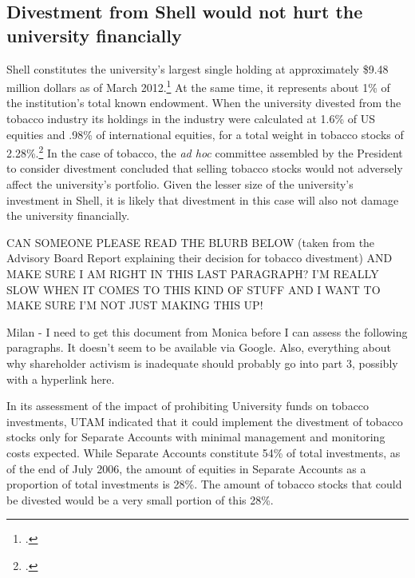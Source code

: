 	\subsection{Divestment from Shell would not hurt the university financially}
	\label{sec:ShellNotFinancialHurt}



Shell constitutes the university's largest single holding at approximately \$9.48 million dollars as of March 2012.\footcite[][]{UTAM_2012}  
At the same time, it represents about 1\% of the institution's total known endowment.
When the university divested from the tobacco industry its holdings in the industry were calculated at 1.6\% of US equities and .98\% of international equities, for a total weight in tobacco stocks of 2.28\%.\footcite[][]{TobaccoReport_2007}
In the case of tobacco, the \emph{ad hoc} committee assembled by the President to consider divestment concluded that selling tobacco stocks  would not adversely affect the university's portfolio. 
Given the lesser size of the university's investment in Shell, it is likely that divestment in this case will also not damage the university financially.



\begin{vcom}
CAN SOMEONE PLEASE READ THE BLURB BELOW (taken from the Advisory Board Report explaining their decision for tobacco divestment) AND MAKE SURE I AM RIGHT IN THIS LAST PARAGRAPH? I’M REALLY SLOW WHEN IT COMES TO THIS KIND OF STUFF AND I WANT TO MAKE SURE I’M NOT JUST MAKING THIS UP!

	Milan - I need to get this document from Monica before I can assess the following paragraphs. It doesn't seem to be available via Google. Also, everything about why shareholder activism is inadequate should probably go into part 3, possibly with a hyperlink here. 
\end{vcom}



In its assessment of the impact of prohibiting University funds on tobacco investments, UTAM indicated that it could implement the divestment of tobacco stocks only for Separate Accounts with minimal management and monitoring costs expected. 
While Separate Accounts constitute 54\% of total investments, as of the end of July 2006, the amount of equities in Separate Accounts as a proportion of total investments is 28\%. 
The amount of tobacco stocks that could be divested would be a very small portion of this 28\%.



